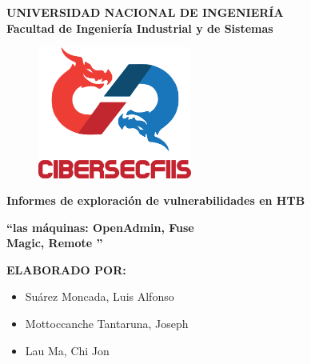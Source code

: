 \begin{titlepage}
	
	
	\begin{center}
		{\LARGE \textbf{UNIVERSIDAD NACIONAL DE INGENIERÍA}}\\
		\vspace{5 mm}
		{\large \textbf{Facultad de Ingeniería Industrial y de Sistemas}}\\
		\vspace{15.5 mm}
		\begin{figure}[h]
			\centering 
			\includegraphics[width=0.45\textwidth]{images/CiberSecFIIS.png}
		\end{figure}
		\vspace{4 mm}	
		{\Large \textbf{Informes de exploración de vulnerabilidades en HTB} }\\
		\vspace{5 mm}
		
		\onehalfspacing  %
		{\Large \textbf{``{\@De las máquinas: OpenAdmin, Fuse \\Magic, Remote }''} }\\
		
		\singlespacing  %
		
		\vspace{4 mm}	

		\vspace{20 mm}
		{\large \textbf{ELABORADO POR:} }\\
		\vspace{10 mm}
		\begin{center}
			\begin{minipage}{0.7\textwidth}
			  \begin{itemize}
				\item \Large Suárez Moncada, Luis Alfonso
				\item \Large Mottoccanche Tantaruna, Joseph
				\item \Large Lau Ma, Chi Jon
			  \end{itemize}
			\end{minipage}
		  \end{center}

		\vspace{5 mm}	
	\end{center}

\end{titlepage}

